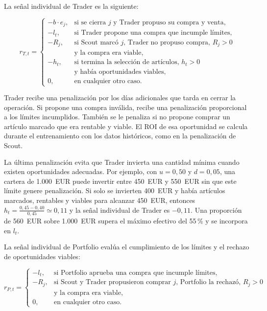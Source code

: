 La señal individual de Trader es la siguiente:

\begin{equation}
r_{T,t}=
\begin{cases}
-b\cdot e_j,
& \text{si se cierra } j \text{ y Trader propuso su compra y venta}, \\
-l_t,
& \text{si Trader propone una compra que incumple límites}, \\
-R_j,
& \text{si Scout marcó } j \text{, Trader no propuso compra, } R_j>0 \\
& \text{y la compra era viable}, \\
-h_t,
& \text{si termina la selección de artículos, } h_t>0 \\
& \text{y había oportunidades viables}, \\
0,
& \text{en cualquier otro caso}.
\end{cases}
\label{eq:recompensa-trader}
\end{equation}

Trader recibe una penalización por los días adicionales que tarda en cerrar la operación. Si propone una compra inválida, recibe una penalización proporcional a los límites incumplidos. También se le penaliza si no propone comprar un artículo marcado que era rentable y viable. El ROI de esa oportunidad se calcula durante el entrenamiento con los datos históricos, como en la penalización de Scout.

La última penalización evita que Trader invierta una cantidad mínima cuando existen oportunidades adecuadas. Por ejemplo, con $u=0{,}50$ y $d=0{,}05$, una cartera de 1.000~EUR puede invertir entre 450~EUR y 550~EUR sin que este límite genere penalización. Si solo se invierten 400~EUR y había artículos marcados, rentables y viables para alcanzar 450~EUR, entonces $h_t=\frac{0{,}45-0{,}40}{0{,}45}\simeq0{,}11$ y la señal individual de Trader es $-0{,}11$. Una proporción de 560~EUR sobre 1.000~EUR supera el máximo efectivo del 55\,\% y se incorpora en $l_t$.

La señal individual de Portfolio evalúa el cumplimiento de los límites y el rechazo de oportunidades viables:

\begin{equation}
r_{P,t}=
\begin{cases}
-l_t,
& \text{si Portfolio aprueba una compra que incumple límites}, \\
-R_j,
& \text{si Scout y Trader propusieron comprar } j \text{, Portfolio la rechazó, } R_j>0 \\
& \text{y la compra era viable}, \\
0,
& \text{en cualquier otro caso}.
\end{cases}
\label{eq:recompensa-portfolio}
\end{equation}

